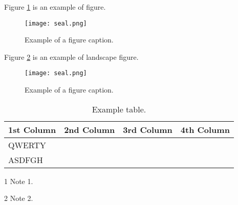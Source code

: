 \documentclass{ncs-thesis}
\begin{document}
\makecover                          %
\makeverification                   %


\maketableofcontents                %
\makelistoffigures                  %
\makelistoftables                   %



Figure \ref{fig} is an example of figure.
\begin{figure}[htbp]
    \centerline{\texttt{[image: seal.png]}}
    \caption{Example of a figure caption.}
    \label{fig}
\end{figure}

Figure \ref{fig2} is an example of landscape figure.
\begin{landscape}
\begin{figure}[htbp]
    \centerline{\texttt{[image: seal.png]}}
    \caption{Example of a figure caption.}
    \label{fig2}
\end{figure}
\end{landscape}

\begin{table}[htbp]
    \begin{center}
    \begin{threeparttable}
     \caption{Example table.\label{tab}}
     \centering
        \begin{tabular}{l c c c}
            \toprule
                \textbf{1st Column} & \textbf{2nd Column} & \textbf{3rd Column} & \textbf{4th Column} \\ 
            \midrule
                QWERTY\tnote{1}   &                     &                     &  \\
                ASDFGH\tnote{2}   &                     &                     &  \\ 
            \bottomrule
        \end{tabular}
        \begin{tablenotes}
            \item [1] Note 1. 
            \item [2] Note 2.
        \end{tablenotes}
    \end{threeparttable}
\end{center}
\end{table}
\end{document}
